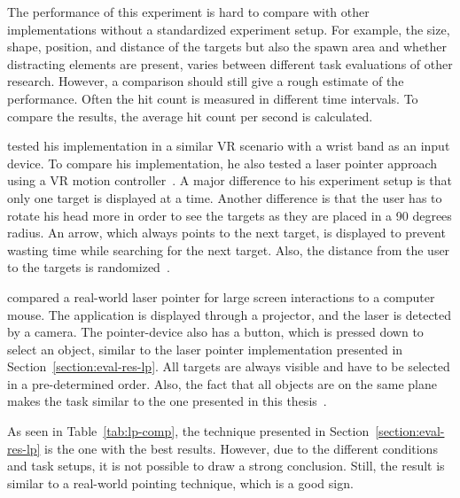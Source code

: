The performance of this experiment is hard to compare with other implementations without a standardized experiment setup. For example, the size, shape, position, and distance of the targets but also the spawn area and whether distracting elements are present, varies between different task evaluations of other research. However, a comparison should still give a rough estimate of the performance. Often the hit count is measured in different time intervals. To compare the results, the average hit count per second is calculated.

\citeauthor{Kamm.2018} tested his implementation in a similar \gls{VR} scenario with a wrist band as an input device. To compare his implementation, he also tested a laser pointer approach using a \gls{VR} motion controller~\cite[39]{Kamm.2018}. A major difference to his experiment setup is that only one target is displayed at a time. Another difference is that the user has to rotate his head more in order to see the targets as they are placed in a 90 degrees radius. An arrow, which always points to the next target, is displayed to prevent wasting time while searching for the next target. Also, the distance from the user to the targets is randomized~\cite[45]{Kamm.2018}.

\citeauthor{JiYoungOh.2002} compared a real-world laser pointer for large screen interactions to a computer mouse. The application is displayed through a projector, and the laser is detected by a camera. The pointer-device also has a button, which is pressed down to select an object, similar to the laser pointer implementation presented in Section~\ref{section:eval-res-lp}. All targets are always visible and have to be selected in a pre-determined order. Also, the fact that all objects are on the same plane makes the task similar to the one presented in this thesis~\cite[3\psq]{JiYoungOh.2002}.

As seen in Table~\ref{tab:lp-comp}, the technique presented in Section~\ref{section:eval-res-lp} is the one with the best results. However, due to the different conditions and task setups, it is not possible to draw a strong conclusion. Still, the result is similar to a real-world pointing technique, which is a good sign.

